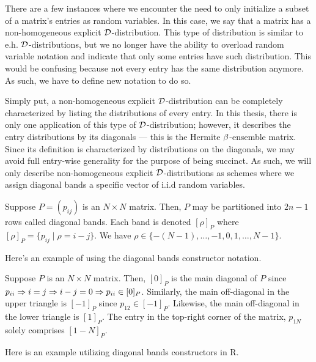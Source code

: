 
There are a few instances where we encounter the need to only initialize a subset of a matrix's entries as random variables. In this case, we say that a matrix has a non-homogeneous explicit $\mathcal{D}$-distribution.
This type of distribution is similar to e.h. $\mathcal{D}$-distributions, but we no longer have the ability to overload random variable notation and indicate that only some entries have such distribution. This would be
confusing because not every entry has the same distribution anymore. As such, we have to define new notation to do so.

Simply put, a non-homogeneous explicit $\mathcal{D}$-distribution can be completely characterized by listing the distributions of every entry.
In this thesis, there is only one application of this type of $\mathcal{D}$-distribution; however, it describes the entry distributions by its diagonals --- this is the Hermite $\beta$-ensemble matrix.
Since its definition is characterized by distributions on the diagonals, we may avoid full entry-wise generality for the purpose of being succinct.
As such, we will only describe non-homogeneous explicit $\mathcal{D}$-distributions as schemes where we assign diagonal bands a specific vector of i.i.d random variables.

\begin{definition}
Suppose $P = (p_{ij})$ is an $N \times N$ matrix. Then, $P$ may be partitioned into $2n - 1$ rows called diagonal bands. Each band is denoted $[\rho]_P$ where $[\rho]_P = \{p_{ij} \mid \rho = i - j\}$. We have
$\rho \in \{ -(N-1), \dots, -1, 0, 1, \dots, N-1 \}$.
\end{definition}

Here's an example of using the diagonal bands constructor notation.

\begin{example}
Suppose $P$ is an $N \times N$ matrix. Then, $[0]_P$ is the main diagonal of $P$ since $p_{ii} \Rightarrow i = j \Rightarrow i - j = 0 \Rightarrow p_{ii} \in [0]_P$.
Similarly, the main off-diagonal in the upper triangle is $[-1]_P$ since $p_{12} \in [-1]_P$.
Likewise, the main off-diagonal in the lower triangle is $[1]_P$. The entry in the top-right corner of the matrix, $p_{1N}$ solely comprises $[1 - N]_P$.
\end{example}

\begin{code}
Here is an example utilizing diagonal bands constructors in R.
\end{code}


